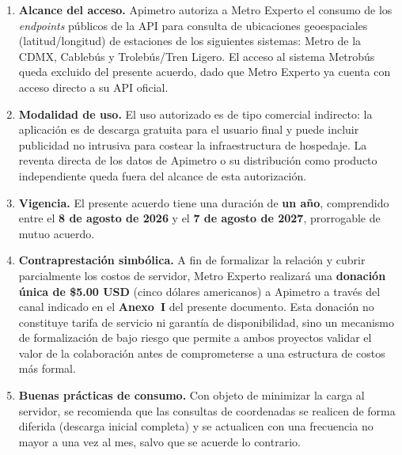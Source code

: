 \begin{enumerate}[leftmargin=1.8em, label=\textbf{\arabic{enumi}.}]

  \item \textbf{Alcance del acceso.} Apimetro autoriza a Metro Experto el
        consumo de los \textit{endpoints} públicos de la API para consulta de
        ubicaciones geoespaciales (latitud/longitud) de estaciones de los
        siguientes sistemas: Metro de la CDMX, Cablebús y Trolebús/Tren
        Ligero. El acceso al sistema Metrobús queda excluido del presente
        acuerdo, dado que Metro Experto ya cuenta con acceso directo a su
        API oficial.

  \item \textbf{Modalidad de uso.} El uso autorizado es de tipo comercial
        indirecto: la aplicación es de descarga gratuita para el usuario
        final y puede incluir publicidad no intrusiva para costear la
        infraestructura de hospedaje. La reventa directa de los datos de
        Apimetro o su distribución como producto independiente queda fuera
        del alcance de esta autorización.

  \item \textbf{Vigencia.} El presente acuerdo tiene una duración de
        \textbf{un año}, comprendido entre el \textbf{8 de agosto de 2026}
        y el \textbf{7 de agosto de 2027}, prorrogable de mutuo acuerdo.

  \item \textbf{Contraprestación simbólica.} A fin de formalizar la
        relación y cubrir parcialmente los costos de servidor, Metro Experto
        realizará una \textbf{donación única de \$5.00 USD} (cinco dólares
        americanos) a Apimetro a través del canal indicado en el
        \textbf{Anexo~I} del presente documento. Esta donación no constituye
        tarifa de servicio ni garantía de disponibilidad, sino un mecanismo
        de formalización de bajo riesgo que permite a ambos proyectos
        validar el valor de la colaboración antes de comprometerse a una
        estructura de costos más formal.

  \item \textbf{Buenas prácticas de consumo.} Con objeto de minimizar la
        carga al servidor, se recomienda que las consultas de coordenadas se
        realicen de forma diferida (descarga inicial completa) y se
        actualicen con una frecuencia no mayor a una vez al mes, salvo que
        se acuerde lo contrario.

\end{enumerate}

